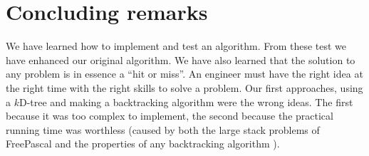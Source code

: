 \chapter{Concluding remarks}
\label{sec:Remarks}
We have learned how to implement and test an algorithm. From these test we have enhanced our original algorithm. We have also learned that the solution to any problem is in essence a ``hit or miss''. An engineer must have the right idea at the right time with the right skills to solve a problem. Our first approaches, using a $k$D-tree and making a backtracking algorithm were the wrong ideas. The first because it was too complex to implement, the second because the practical running time was worthless (caused by both the large stack problems of FreePascal and the properties of any backtracking algorithm ).